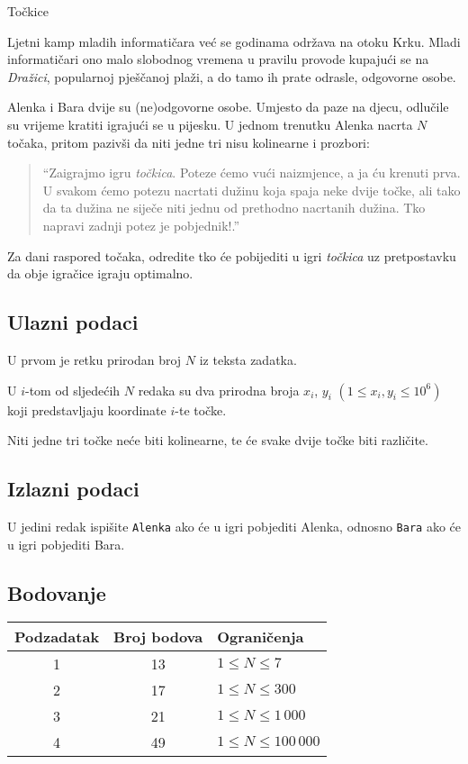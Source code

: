 \begin{statement}[
  problempoints=100,
  timelimit=1 sekunda,
  memorylimit=1024 MiB,
]{Točkice}

Ljetni kamp mladih informatičara već se godinama održava na otoku Krku.  Mladi
informatičari ono malo slobodnog vremena u pravilu provode kupajući se na
\textit{Dražici}, popularnoj pješčanoj plaži, a do tamo ih prate odrasle,
odgovorne osobe.

Alenka i Bara dvije su (ne)odgovorne osobe. Umjesto da paze na djecu, odlučile
su vrijeme kratiti igrajući se u pijesku. U jednom trenutku Alenka nacrta $N$
točaka, pritom pazivši da niti jedne tri nisu kolinearne i prozbori:
\begin{quote}
``Zaigrajmo igru \textit{točkica}. Poteze ćemo vući naizmjence, a ja ću krenuti
  prva. U svakom ćemo potezu nacrtati dužinu koja spaja neke dvije točke, ali
  tako da ta dužina ne siječe niti jednu od prethodno nacrtanih dužina. Tko
  napravi zadnji potez je pobjednik!.''
\end{quote}
Za dani raspored točaka, odredite tko će pobijediti u igri \textit{točkica} uz
pretpostavku da obje igračice igraju optimalno.

\subsection*{Ulazni podaci}
U prvom je retku prirodan broj $N$ iz teksta zadatka.

U $i$-tom od sljedećih $N$ redaka su dva prirodna broja $x_i$, $y_i$ $(1 \leq
x_i, y_i \leq 10^6)$ koji predstavljaju koordinate $i$-te točke.

Niti jedne tri točke neće biti kolinearne, te će svake dvije točke biti različite.
\subsection*{Izlazni podaci}
U jedini redak ispišite \texttt{Alenka} ako će u igri pobjediti Alenka,
odnosno \texttt{Bara} ako će u igri pobjediti Bara.

\subsection*{Bodovanje}
{\renewcommand{\arraystretch}{1.4}
  \setlength{\tabcolsep}{6pt}
  \begin{tabular}{ccl}
 Podzadatak & Broj bodova & Ograničenja \\ \midrule
  1 & 13 & $1 \le N \le 7$\\
  2 & 17 & $1 \le N \le 300$\\
  3 & 21 & $1 \le N \le 1\,000$\\
  4 & 49 & $1 \le N \le 100\,000$\\
\end{tabular}}


\end{statement}
